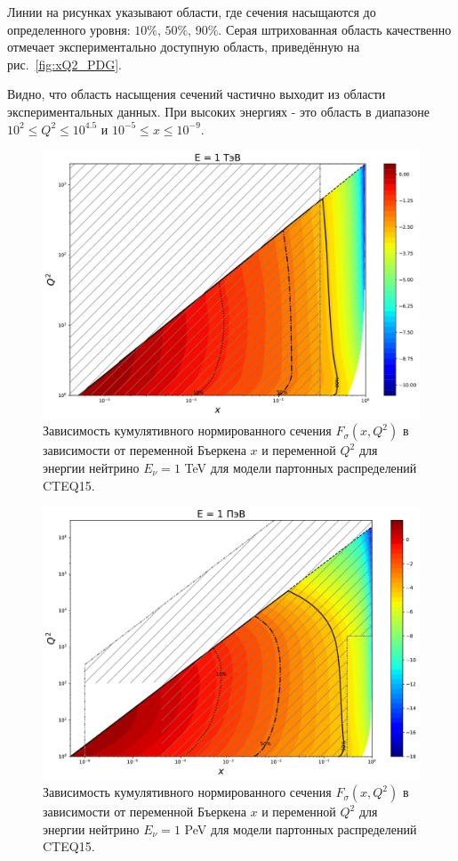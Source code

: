 Линии на рисунках указывают области, где сечения насыщаются до определенного уровня: $10\%$, $50\%$, $90\%$. Серая штрихованная область качественно отмечает экспериментально доступную область, приведённую на рис.~\ref{fig:xQ2_PDG}.

Видно, что область насыщения сечений частично выходит из области экспериментальных данных. При высоких энергиях  - это область в диапазоне $10^2\le Q^2\le10^{4.5} $ и $10^{-5}\le x \le 10^{-9}$.  
 \begin{figure}[!h]
\centering
\includegraphics[width=0.97\linewidth]{images/NuProp/cdfxq2_cc_proton_CT18ZNNLO_14_1000.pdf}
\caption{Зависимость кумулятивного нормированного сечения $F_{\sigma}(x,Q^2)$ в зависимости от переменной Бъеркена $x$ и переменной $Q^2$ для энергии нейтрино $E_{\nu} = 1$ TeV для модели партонных распределений CTEQ15\cite{ncteq15}. }
\label{Pp3}
\end{figure}
\begin{figure}[!h]
\centering
\includegraphics[width=0.97\linewidth]{images/NuProp/cdfxq2_cc_proton_CT18ZNNLO_14_1000000.pdf}
\caption{Зависимость кумулятивного нормированного сечения $F_{\sigma}(x,Q^2)$ в зависимости от переменной Бъеркена $x$ и переменной $Q^2$ для энергии нейтрино $E_{\nu} = 1$ PeV для модели партонных распределений CTEQ15\cite{ncteq15}.}
\label{Pp6}
\end{figure}

